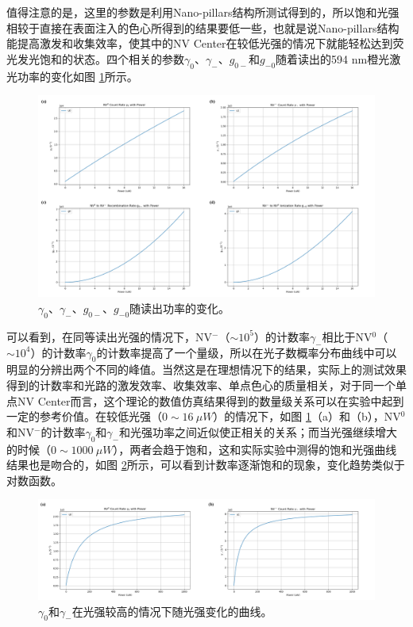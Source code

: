 \documentclass[type = bachelor]{whu-thesis}
\begin{document}
值得注意的是，这里的参数是利用Nano-pillars结构所测试得到的，所以饱和光强相较于直接在表面注入的色心所得到的结果要低一些，也就是说Nano-pillars结构能提高激发和收集效率，使其中的NV Center在较低光强的情况下就能轻松达到荧光发光饱和的状态。四个相关的参数$\gamma_0$、$\gamma_-$、$g_{0-}$和$g_{-0}$随着读出的594 nm橙光激光功率的变化如图 \ref{fig: P_variation_parameters}所示。
\begin{figure}
  \centering
  \includegraphics[width=1.0\textwidth]{figures/Chapter 5/P_variation_parameters.png}
  \caption[$\gamma_0$、$\gamma_-$、$g_{0-}$、$g_{-0}$随读出功率的变化]{$\gamma_0$、$\gamma_-$、$g_{0-}$、$g_{-0}$随读出功率的变化。}
  \label{fig: P_variation_parameters}
\end{figure}
可以看到，在同等读出光强的情况下，NV$^-$（$\sim 10^5$）的计数率$\gamma_-$相比于NV$^0$（$\sim 10^4$）的计数率$\gamma_0$的计数率提高了一个量级，所以在光子数概率分布曲线中可以明显的分辨出两个不同的峰值。当然这是在理想情况下的结果，实际上的测试效果得到的计数率和光路的激发效率、收集效率、单点色心的质量相关，对于同一个单点NV Center而言，这个理论的数值仿真结果得到的数量级关系可以在实验中起到一定的参考价值。在较低光强（$0 \sim 16\ \mu W$）的情况下，如图 \ref{fig: P_variation_parameters}（a）和（b），NV$^0$和NV$^-$的计数率$\gamma_0$和$\gamma_-$和光强功率之间近似使正相关的关系；而当光强继续增大的时候（$0 \sim 1000\ \mu W$），两者会趋于饱和，这和实际实验中测得的饱和光强曲线结果也是吻合的，如图 \ref{fig: P_saturation}所示，可以看到计数率逐渐饱和的现象，变化趋势类似于对数函数。
\begin{figure}
  \centering
  \includegraphics[width=1.0\textwidth]{figures/Chapter 5/P_saturation.png}
  \caption[$\gamma_0$和$\gamma_-$在光强较高的情况下随光强变化的曲线]{$\gamma_0$和$\gamma_-$在光强较高的情况下随光强变化的曲线。}
  \label{fig: P_saturation}
\end{figure}
\end{document}

